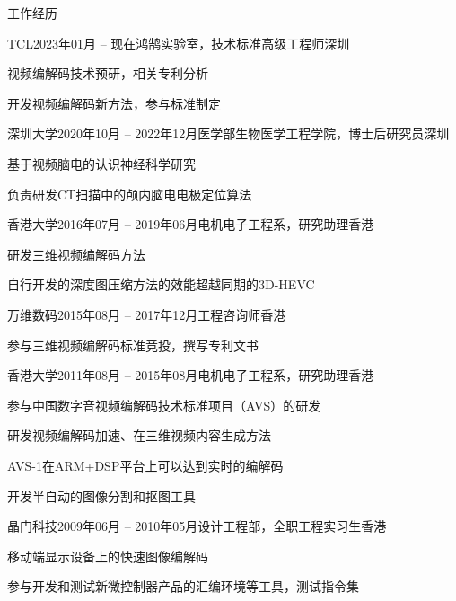 \documentclass{resume} %
\begin{document}
\begin{rSection}{工作经历}
    \begin{rSubsection}{TCL}{2023年01月 -- 现在}{鸿鹄实验室，技术标准高级工程师}{深圳}
        \item 视频编解码技术预研，相关专利分析
		\item 开发视频编解码新方法，参与标准制定
    \end{rSubsection}

    \begin{rSubsection}{深圳大学}{2020年10月 -- 2022年12月}{医学部生物医学工程学院，博士后研究员}{深圳}
        \item 基于视频脑电的认识神经科学研究
        \item 负责研发CT扫描中的颅内脑电电极定位算法
    \end{rSubsection}

	\begin{rSubsection}{香港大学}{2016年07月 -- 2019年06月}{电机电子工程系，研究助理}{香港}
        \item 研发三维视频编解码方法
        \item 自行开发的深度图压缩方法的效能超越同期的3D-HEVC
	\end{rSubsection}

    \begin{rSubsection}{万维数码}{2015年08月 -- 2017年12月}{工程咨询师}{香港}
        \item 参与三维视频编解码标准竞投，撰写专利文书
    \end{rSubsection}

    \begin{rSubsection}{香港大学}{2011年08月 -- 2015年08月}{电机电子工程系，研究助理}{香港}
        \item 参与中国数字音视频编解码技术标准项目（AVS）的研发
        \item 研发视频编解码加速、在三维视频内容生成方法
        \item AVS-1在ARM+DSP平台上可以达到实时的编解码
        \item 开发半自动的图像分割和抠图工具
    \end{rSubsection}

    \begin{rSubsection}{晶门科技}{2009年06月 -- 2010年05月}{设计工程部，全职工程实习生}{香港}
        \item 移动端显示设备上的快速图像编解码
        \item 参与开发和测试新微控制器产品的汇编环境等工具，测试指令集
    \end{rSubsection}
\end{rSection}
\end{document}
